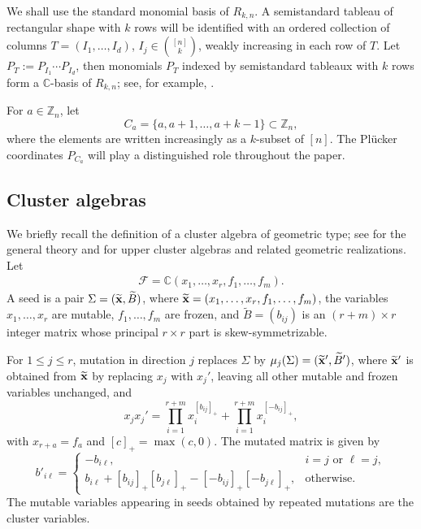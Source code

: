 \documentclass[11pt]{amsart}
\numberwithin{equation}{section}
\newcommand{\bC}{{\mathbb C}}
\newcommand{\bZ}{{\mathbb Z}}
\begin{document}
We shall use the standard monomial basis of $R_{k,n}$.  A
semistandard tableau of rectangular shape with $k$ rows will be
identified with an ordered collection of columns
$T=(I_1,\ldots,I_d)$,
$I_j\in\binom{[n]}{k}$,
weakly increasing in each row of $T$.  Let $P_T:=P_{I_1}\cdots P_{I_d}$, then
monomials $P_T$ indexed by semistandard tableaux with $k$ rows form a $\bC$-basis of $R_{k,n}$; see, for example,
\cite{Hod43, LR08}.

For $a\in\bZ_n$, let
\[
   C_a=\{a,a+1,\ldots,a+k-1\}\subset\bZ_n,
\]
where the elements are written increasingly as a $k$-subset of
$[n]$.  The Pl\"ucker coordinates $P_{C_a}$ will play a distinguished
role throughout the paper.


\subsection{Cluster algebras}
\label{subsec:cluster-algebras}

We briefly recall the definition of a cluster algebra of geometric
type; see \cite{FZ02,FZ07} for the general theory and \cite{BFZ05}
for upper cluster algebras and related geometric realizations.
Let
\begin{align*}
\mathcal F=\bC(x_1,\ldots,x_r,f_1,\ldots,f_m).
\end{align*}
A seed is a pair
$\Sigma=(\widetilde{\bf x},\widetilde B)$, where
$\widetilde{\bf x}=(x_1,\ldots,x_r,f_1,\ldots,f_m)$,
the variables $x_1,\ldots,x_r$ are mutable,
$f_1,\ldots,f_m$ are frozen, and
$\widetilde B=(b_{ij})$ is an $(r+m)\times r$ integer matrix whose
principal $r\times r$ part is skew-symmetrizable.

For $1\leq j\leq r$, mutation in direction $j$ replaces
$\Sigma$ by
$\mu_j(\Sigma)=(\widetilde{\bf x}',\widetilde B')$, where
$\widetilde{\bf x}'$ is obtained from $\widetilde{\bf x}$ by
replacing $x_j$ with $x_j'$, leaving all other mutable and frozen
variables unchanged, and
\begin{equation}\label{eq:cluster-exchange-relation}
x_jx_j'
=
\prod_{i=1}^{r+m}x_i^{[b_{ij}]_+}
+
\prod_{i=1}^{r+m}x_i^{[-b_{ij}]_+},
\end{equation}
with $x_{r+a}=f_a$ and $[c]_+=\max(c,0)$.  The mutated matrix is
given by
\[
b'_{i\ell}
=
\begin{cases}
-b_{i\ell}, & i=j\text{ or }\ell=j,\\
b_{i\ell}+[b_{ij}]_+[b_{j\ell}]_+
-[-b_{ij}]_+[-b_{j\ell}]_+, & \text{otherwise}.
\end{cases}
\]
The mutable variables appearing in seeds obtained by repeated
mutations are the cluster variables.
\end{document}
